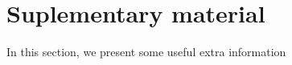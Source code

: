 \documentclass[10pt, a4paper, twocolumn]{article} %
\begin{document}


\onecolumn

\section{Suplementary material}

In this section, we present some useful extra information\\

	

	
\end{document}
